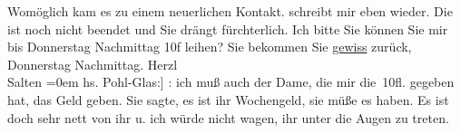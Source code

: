 \begin{ledgroupsized}[t]{13cm}
{{{                  Womöglich kam es zu einem neuerlichen Kontakt.}}}\label{K_L03260-1h} schreibt mir eben wieder.
               Die \label{K_L03260-2v}\label{K_L03260-2h} ist noch nicht beendet und Sie drängt
               fürchterlich. Ich bitte Sie können Sie mir bis Donnerstag{ }Nachmittag{ }10f {\pb}leihen?
               Sie bekommen Sie \uline{gewiss} zurück, Donnerstag{ }Nachmittag.\pend
           \pstart
           Herzl {\\[\baselineskip]}\spacefill\mbox{Salten}\pend
           \leftskip=0em{}{\bigskip}\pstart
           \noindent{}{\pb}{[}hs. Pohl-Glas:{]} \label{K_L03260-3v}\label{K_L03260-3h}: ich muß auch der Dame, die mir die 10fl. gegeben hat, das
               Geld geben. Sie sagte, es ist ihr Wochengeld, sie müße es haben. Es ist doch sehr
               nett von ihr u. ich würde nicht wagen, ihr unter die Augen zu treten.\pend
           
         
         \endnumbering{}\end{ledgroupsized}  \newcommand{\dateiname}{L03260}\newcommand{\titel}{Felix Salten an Arthur Schnitzler, [27. 2. 1897]}\newcommand{\editorInnen}{Martin Anton Müller und Laura Untner}
      